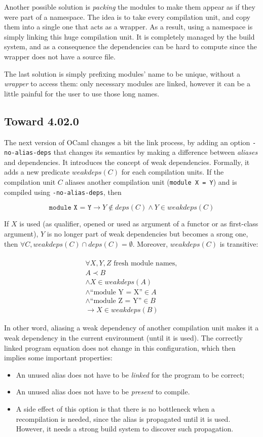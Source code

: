 Another possible solution is \emph{packing} the modules to make them appear as
if they were part of a namespace. The idea is to take every compilation unit,
and copy them into a single one that acts as a wrapper. As a result, using a
namespace is simply linking this huge compilation unit. It is completely managed
by the build system, and as a consequence the dependencies can be hard to
compute since the wrapper does not have a source file.

The last solution is simply prefixing modules' name to be unique, without a
\emph{wrapper} to access them: only necessary modules are linked, however it can
be a little painful for the user to use those long names.

\subsection{Toward 4.02.0}

The next version of OCaml changes a bit the link process, by adding an option
\texttt{-no-alias-deps} that changes its semantics by making a difference
between \emph{aliases} and dependencies. It introduces the concept of weak
dependencies. Formally, it adds a new predicate $weakdeps(C)$ for each
compilation units. If the compilation unit $C$ aliases another compilation unit
(\texttt{module X = Y}) and is compiled using \texttt{-no-alias-deps}, then

$$\texttt{module~X = Y} \rightarrow Y \notin deps(C) \land Y \in weakdeps(C)$$ 

If $X$ is used (as qualifier, opened or used as argument of a functor or as
first-class argument), $Y$ is no longer part of weak dependencies but becomes a
srong one, then $\forall C, weakdeps(C) \cap deps(C) = \emptyset$. Moreover,
$weakdeps(C)$ is transitive:

\begin{multline} \\
\forall X, Y, Z \text{ fresh module names}, \\ A \prec B \\
\land X \in weakdeps(A) \\ 
\land \text{``module Y = X''} \in A \\
\land \text{``module Z = Y''} \in B \\
\rightarrow X \in weakdeps(B)
\end{multline}

In other word, aliasing a weak dependency of another compilation unit makes it a
weak dependency in the current environment (until it is used). The correctly
linked program equation does not change in this configuration, which then
implies some important properties:
\begin{itemize}
\item An unused alias does not have to be \emph{linked} for the program to be correct;
\item An unused alias does not have to be \emph{present} to compile.
\item A side effect of this option is that there is no bottleneck when a
  recompilation is needed, since the alias is propagated until it is
  used. However, it needs a strong build system to discover such propagation.
\end{itemize}


